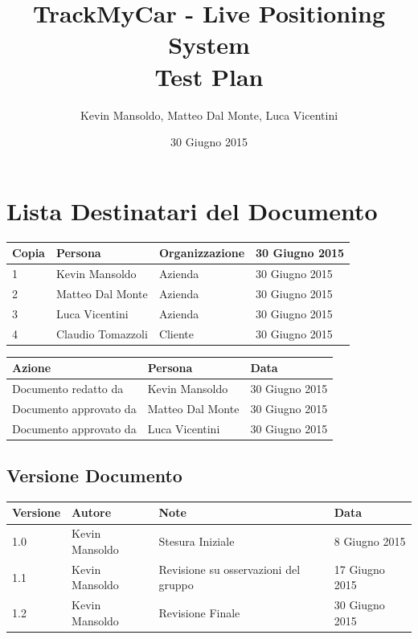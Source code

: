 \documentclass[a4paper,12pt]{article}
\begin{document}
\title{\textbf{TrackMyCar - Live Positioning System} \\ Test Plan}

\author{Kevin Mansoldo, Matteo Dal Monte, Luca Vicentini}
\date{30 Giugno 2015}
\maketitle
\pagebreak

\tableofcontents
\pagebreak

\section{Lista Destinatari del Documento}

\begin{table}[ht]
\begin{center}
\begin{tabular}{p{1cm} p{4.5cm} p{3.5cm} p{3.5cm}}
\rowcolor{Ash}
\hline
Copia & Persona & Organizzazione & 30 Giugno 2015 \\ \hline
1 & Kevin Mansoldo & Azienda & 30 Giugno 2015 \\ 
2 & Matteo Dal Monte & Azienda & 30 Giugno 2015 \\ 
3 & Luca Vicentini & Azienda & 30 Giugno 2015 \\ 
4 & Claudio Tomazzoli & Cliente & 30 Giugno 2015 \\ \hline
\end{tabular}
\end{center}


\begin{center}
\begin{tabular}{p{6cm} p{3.5cm} p{3.5cm}}
\rowcolor{Ash}
\hline
Azione & Persona & Data \\ \hline
Documento redatto da & Kevin Mansoldo & 30 Giugno 2015 \\ 
Documento approvato da & Matteo Dal Monte & 30 Giugno 2015 \\ 
Documento approvato da & Luca Vicentini & 30 Giugno 2015 \\ \hline
\end{tabular}
\end{center}
\end{table}

\subsection{Versione Documento}
\begin{table}[ht]
\begin{center}
\begin{tabular}{p{1cm} p{3cm} p{5cm} p{3.5cm}}
\rowcolor{Ash}
\hline
Versione & Autore & Note & Data \\ \hline
1.0 & Kevin Mansoldo & Stesura Iniziale & 8 Giugno 2015 \\ 
1.1 & Kevin Mansoldo & Revisione su osservazioni del gruppo & 17 Giugno 2015 \\ 
1.2 & Kevin Mansoldo & Revisione Finale & 30 Giugno 2015 \\ \hline
\end{tabular}
\end{center}
\end{table}
\end{document}
